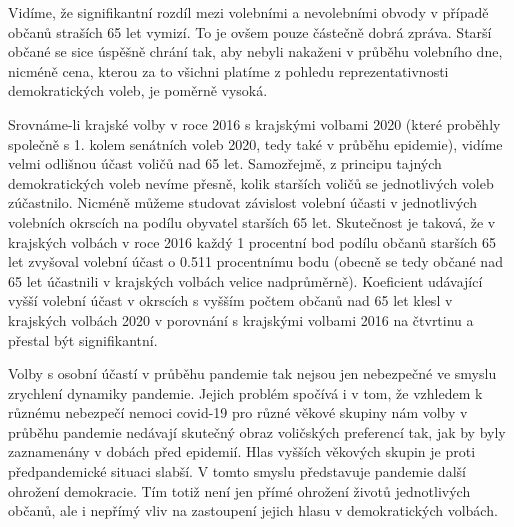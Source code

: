 Vidíme, že signifikantní rozdíl mezi volebními a nevolebními obvody v případě občanů straších 65 let vymizí. To je ovšem pouze částečně dobrá zpráva. Starší občané se sice úspěšně chrání tak, aby nebyli nakaženi v průběhu volebního dne, nicméně cena, kterou za to všichni platíme z pohledu reprezentativnosti demokratických voleb, je poměrně vysoká. 

Srovnáme-li krajské volby v roce 2016 s krajskými volbami 2020 (které proběhly společně s 1. kolem senátních voleb 2020, tedy také v průběhu epidemie), vidíme velmi odlišnou účast voličů nad 65 let. Samozřejmě, z principu tajných demokratických voleb nevíme přesně, kolik starších voličů se jednotlivých voleb zúčastnilo. Nicméně můžeme studovat závislost volební účasti v jednotlivých volebních okrscích na podílu obyvatel starších 65 let. Skutečnost je taková, že v krajských volbách v roce 2016 každý 1 procentní bod podílu občanů starších 65 let zvyšoval volební účast o 0.511 procentnímu bodu (obecně se tedy občané nad 65 let účastnili v krajských volbách velice nadprůměrně). Koeficient udávající vyšší volební účast v okrscích s vyšším počtem občanů nad 65 let klesl v krajských volbách 2020 v porovnání s krajskými volbami 2016 na čtvrtinu a přestal být signifikantní.

Volby s osobní účastí v průběhu pandemie tak nejsou jen nebezpečné ve smyslu zrychlení dynamiky pandemie. Jejich problém spočívá i v tom, že vzhledem k různému nebezpečí nemoci covid-19 pro různé věkové skupiny nám volby v průběhu pandemie nedávají skutečný obraz voličských preferencí tak, jak by byly zaznamenány v dobách před epidemií. Hlas vyšších věkových skupin je proti předpandemické situaci slabší. V tomto smyslu představuje pandemie další ohrožení demokracie. Tím totiž není jen přímé ohrožení životů jednotlivých občanů, ale i nepřímý vliv na zastoupení jejich hlasu v demokratických volbách.


